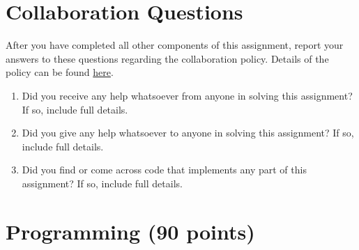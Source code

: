 \documentclass[11pt,addpoints,answers]{exam}
\begin{document}
\begin{questions}

\clearpage
\newpage
\end{questions}
\newpage
\section{Collaboration Questions}
After you have completed all other components of this assignment, report your answers to these questions regarding the collaboration policy. Details of the policy can be found \href{https://www.cs.cmu.edu/~hchai2/courses/10601/#Syllabus}{here}.
\begin{enumerate}
    \item Did you receive any help whatsoever from anyone in solving this assignment? If so, include full details.
    \item Did you give any help whatsoever to anyone in solving this assignment? If so, include full details.
    \item Did you find or come across code that implements any part of this assignment? If so, include full details.
\end{enumerate}

\begin{your_solution}[height=6cm]

\end{your_solution}

\newpage
\section{Programming (90 points)}
\label{programming}
\end{document}
